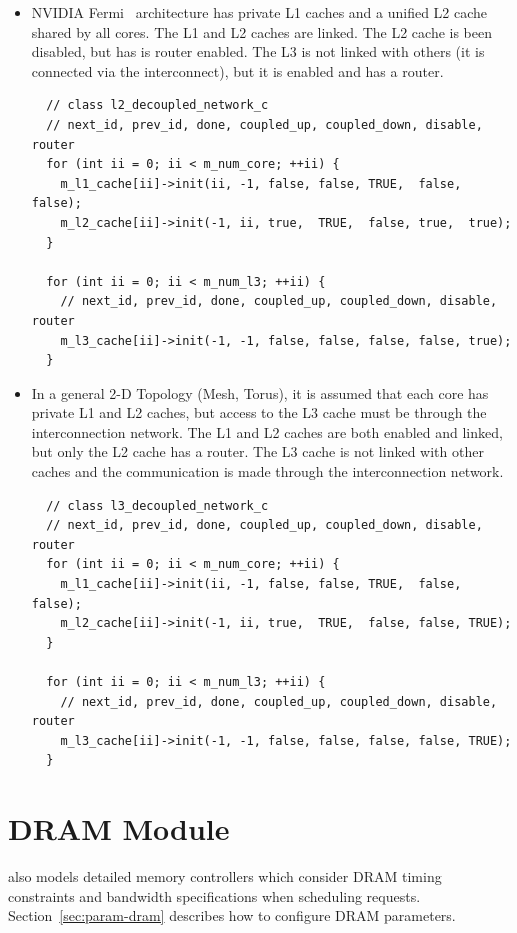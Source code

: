 \begin{itemize}
  \item NVIDIA Fermi~\cite{fermi} architecture has private L1 caches and a
  unified L2 cache shared by all cores. The L1 and L2 caches are linked. The L2
  cache is been disabled, but has is router enabled. The L3 is not linked with
  others (it is connected via the interconnect), but it is enabled and has a
  router.

  \begin{Verbatim}
  // class l2_decoupled_network_c
  // next_id, prev_id, done, coupled_up, coupled_down, disable, router
  for (int ii = 0; ii < m_num_core; ++ii) {
    m_l1_cache[ii]->init(ii, -1, false, false, TRUE,  false, false);
    m_l2_cache[ii]->init(-1, ii, true,  TRUE,  false, true,  true);
  }

  for (int ii = 0; ii < m_num_l3; ++ii) {
    // next_id, prev_id, done, coupled_up, coupled_down, disable, router
    m_l3_cache[ii]->init(-1, -1, false, false, false, false, true);
  }
  \end{Verbatim}
  
  \item In a general 2-D Topology (Mesh, Torus), it is assumed that each core
  has private L1 and L2 caches, but access to the L3 cache must be 
  through the interconnection network. The L1 and L2 caches are both enabled
  and linked, but only the L2 cache has a router. The L3 cache is not linked
  with other caches and the communication is made through the interconnection
  network.

  \begin{Verbatim}
  // class l3_decoupled_network_c
  // next_id, prev_id, done, coupled_up, coupled_down, disable, router
  for (int ii = 0; ii < m_num_core; ++ii) {
    m_l1_cache[ii]->init(ii, -1, false, false, TRUE,  false, false);
    m_l2_cache[ii]->init(-1, ii, true,  TRUE,  false, false, TRUE);
  }

  for (int ii = 0; ii < m_num_l3; ++ii) {
    // next_id, prev_id, done, coupled_up, coupled_down, disable, router
    m_l3_cache[ii]->init(-1, -1, false, false, false, false, TRUE);
  }
  \end{Verbatim}
\end{itemize}

\section{DRAM Module} 
\label{sec:dram}

\SIM also models detailed memory controllers which consider DRAM timing
constraints and bandwidth specifications when scheduling requests. Section~\ref{sec:param-dram} describes how to
  configure DRAM parameters.

